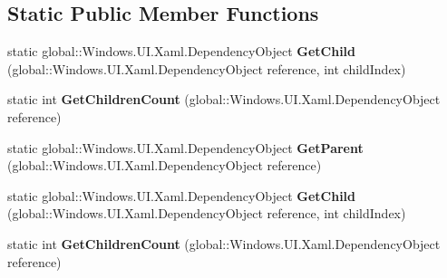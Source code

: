 \subsection*{Static Public Member Functions}
\begin{DoxyCompactItemize}
\item 
\mbox{\label{class_windows_1_1_u_i_1_1_xaml_1_1_media_1_1_visual_tree_helper_a3a4a777df4fdf53b1c650f8072c9cdf7}} 
static global\+::\+Windows.\+U\+I.\+Xaml.\+Dependency\+Object {\bfseries Get\+Child} (global\+::\+Windows.\+U\+I.\+Xaml.\+Dependency\+Object reference, int child\+Index)
\item 
\mbox{\label{class_windows_1_1_u_i_1_1_xaml_1_1_media_1_1_visual_tree_helper_a9856a6b0d01e09cdc7047af1d0dc4188}} 
static int {\bfseries Get\+Children\+Count} (global\+::\+Windows.\+U\+I.\+Xaml.\+Dependency\+Object reference)
\item 
\mbox{\label{class_windows_1_1_u_i_1_1_xaml_1_1_media_1_1_visual_tree_helper_a9aac21ec03d8e2464c23d385bb664a28}} 
static global\+::\+Windows.\+U\+I.\+Xaml.\+Dependency\+Object {\bfseries Get\+Parent} (global\+::\+Windows.\+U\+I.\+Xaml.\+Dependency\+Object reference)
\item 
\mbox{\label{class_windows_1_1_u_i_1_1_xaml_1_1_media_1_1_visual_tree_helper_a3a4a777df4fdf53b1c650f8072c9cdf7}} 
static global\+::\+Windows.\+U\+I.\+Xaml.\+Dependency\+Object {\bfseries Get\+Child} (global\+::\+Windows.\+U\+I.\+Xaml.\+Dependency\+Object reference, int child\+Index)
\item 
\mbox{\label{class_windows_1_1_u_i_1_1_xaml_1_1_media_1_1_visual_tree_helper_a9856a6b0d01e09cdc7047af1d0dc4188}} 
static int {\bfseries Get\+Children\+Count} (global\+::\+Windows.\+U\+I.\+Xaml.\+Dependency\+Object reference)
\item 
\mbox{\label{class_windows_1_1_u_i_1_1_xaml_1_1_media_1_1_visual_tree_helper_a9aac21ec03d8e2464c23d385bb664a28}} 

\end{DoxyCompactItemize}

